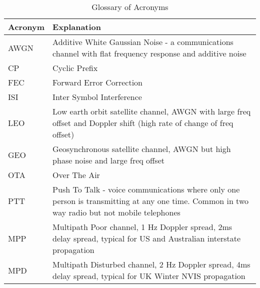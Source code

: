 \documentclass{article}
\begin{document}
\begin{table}[h]
\centering
\begin{tabular}{l p{8cm} }
 \hline
 Acronym & Explanation \\
 \hline
 AWGN & Additive White Gaussian Noise - a communications channel with flat frequency response and additive noise \\
 CP & Cyclic Prefix \\
 FEC & Forward Error Correction \\
 ISI & Inter Symbol Interference \\
 LEO & Low earth orbit satellite channel, AWGN with large freq offset and Doppler shift (high rate of change of freq offset) \\
 GEO & Geosynchronous satellite channel, AWGN but high phase noise and large freq offset \\
 OTA & Over The Air \\
 PTT & Push To Talk - voice communications where only one person is transmitting at any one time.  Common in two way radio but not mobile telephones  \\
 MPP & Multipath Poor channel, 1 Hz Doppler spread, 2ms delay spread, typical for US and Australian interstate propagation \\
 MPD & Multipath Disturbed channel, 2 Hz Doppler spread, 4ms delay spread, typical for UK Winter NVIS propagation \\
 \hline
\end{tabular}
\caption{Glossary of Acronyms}
\end{table}
\end{document}
